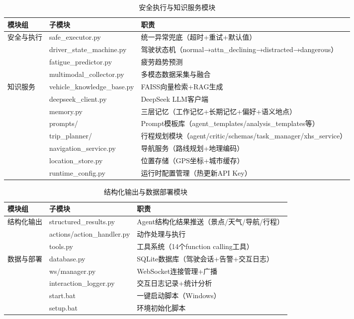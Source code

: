 \documentclass[a4paper]{article}
\begin{document}
\begin{table}[htbp]
  \centering\small
  \caption{安全执行与知识服务模块}
  \label{tab:modules3}
  \begin{tabular}{lll}
  \toprule
  模块组 & 子模块 & 职责 \\
  \midrule
  \multirow{4}{*}{安全与执行} & safe\_executor.py & 统一异常兜底（超时+重试+默认值）\\
  & driver\_state\_machine.py & 驾驶状态机（normal→attn\_declining→distracted→dangerous）\\
  & fatigue\_predictor.py & 疲劳趋势预测 \\
  & multimodal\_collector.py & 多模态数据采集与融合 \\
  \midrule
  \multirow{8}{*}{知识服务} & vehicle\_knowledge\_base.py & FAISS向量检索+RAG生成 \\
  & deepseek\_client.py & DeepSeek LLM客户端 \\
  & memory.py & 三层记忆（工作记忆+长期记忆+偏好+语义地点）\\
  & prompts/ & Prompt模板库（agent\_templates/analysis\_templates等）\\
  & trip\_planner/ & 行程规划模块（agent/critic/schemas/task\_manager/xhs\_service）\\
  & navigation\_service.py & 导航服务（路线规划+地理编码）\\
  & location\_store.py & 位置存储（GPS坐标+城市缓存）\\
  & runtime\_config.py & 运行时配置管理（热更新API Key）\\
  \bottomrule
  \end{tabular}
\end{table}

\begin{table}[htbp]
  \centering\small
  \caption{结构化输出与数据部署模块}
  \label{tab:modules4}
  \begin{tabular}{lll}
  \toprule
  模块组 & 子模块 & 职责 \\
  \midrule
  \multirow{3}{*}{结构化输出} & structured\_results.py & Agent结构化结果推送（景点/天气/导航/行程）\\
  & actions/action\_handler.py & 动作处理与执行 \\
  & tools.py & 工具系统（14个function calling工具）\\
  \midrule
  \multirow{5}{*}{数据与部署} & database.py & SQLite数据库（驾驶会话+告警+交互日志）\\
  & ws/manager.py & WebSocket连接管理+广播 \\
  & interaction\_logger.py & 交互日志记录+统计分析 \\
  & start.bat & 一键启动脚本（Windows）\\
  & setup.bat & 环境初始化脚本 \\
  \bottomrule
  \end{tabular}
\end{table}
\end{document}
